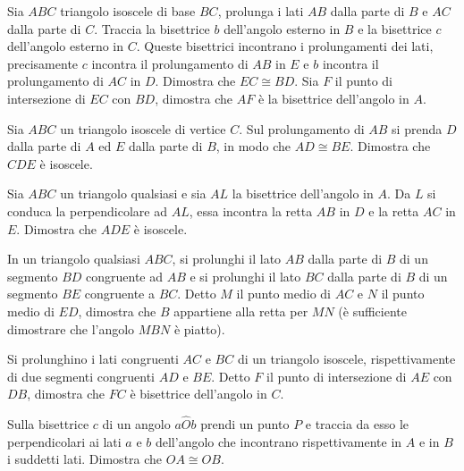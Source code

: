 \begin{multicols}{2}
\begin{esercizio}
\label{ese:2.83}
Sia $ABC$ triangolo isoscele di base $BC$, prolunga i lati $AB$ dalla parte di $B$ e $AC$ dalla parte di $C$. Traccia la bisettrice $b$ dell'angolo esterno in $B$ e la bisettrice $c$ dell'angolo esterno in $C$. Queste bisettrici incontrano i prolungamenti dei lati, precisamente $c$ incontra il prolungamento di $AB$ in $E$ e $b$ incontra il prolungamento di $AC$ in $D$. Dimostra che $EC\cong BD$. Sia $F$ il punto di intersezione di $EC$ con $BD$, dimostra che $AF$ è la bisettrice dell'angolo in $A$.
\end{esercizio}

\begin{esercizio}
\label{ese:2.84}
Sia $ABC$ un triangolo isoscele di vertice $C$. Sul prolungamento di $AB$ si prenda $D$ dalla parte di $A$ ed $E$ dalla parte di $B$, in modo che $AD\cong BE$. Dimostra che $CDE$ è isoscele.
\end{esercizio}

\begin{esercizio}
\label{ese:2.85}
Sia $ABC$ un triangolo qualsiasi e sia $AL$ la bisettrice dell'angolo in $A$. Da $L$ si conduca la perpendicolare ad $AL$, essa incontra la retta $AB$ in $D$ e la retta $AC$ in $E$. Dimostra che $ADE$ è isoscele.
\end{esercizio}

\begin{esercizio}
\label{ese:2.86}
In un triangolo qualsiasi $ABC$, si prolunghi il lato $AB$ dalla parte di $B$ di un segmento $BD$ congruente ad $AB$ e si prolunghi il lato $BC$ dalla parte di $B$ di un segmento $BE$ congruente a $BC$. Detto $M$ il punto medio di $AC$ e $N$ il punto medio di $ED$, dimostra che $B$ appartiene alla retta per $MN$ (è sufficiente dimostrare che l'angolo $MBN$ è piatto).
\end{esercizio}

\begin{esercizio}
\label{ese:2.87}
Si prolunghino i lati congruenti $AC$ e $BC$ di un triangolo isoscele, rispettivamente di due segmenti congruenti $AD$ e $BE$. Detto $F$ il punto di intersezione di $AE$ con $DB$, dimostra che $FC$ è bisettrice dell'angolo in $C$.
\end{esercizio}

\begin{esercizio}
\label{ese:2.88}
Sulla bisettrice $c$ di un angolo $a\widehat{O}b$ prendi un punto $P$ e traccia da esso le perpendicolari ai lati $a$ e $b$ dell'angolo che incontrano rispettivamente in $A$ e in $B$ i suddetti lati. Dimostra che $OA\cong OB$.
\end{esercizio}


\end{multicols}
